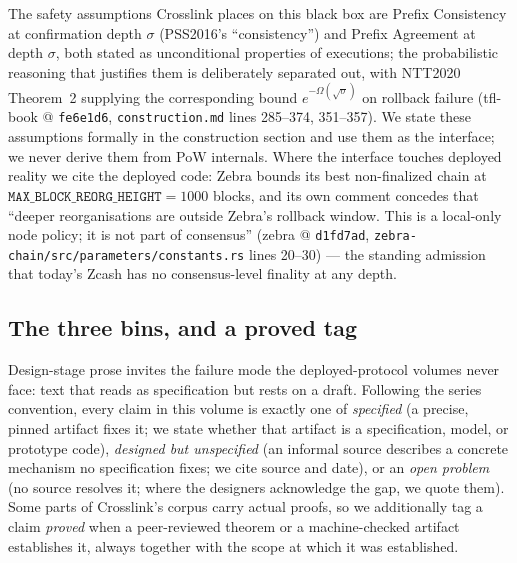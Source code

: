 \documentclass[11pt,a4paper]{article}
\theoremstyle{definition}
\begin{document}
The safety assumptions Crosslink places on this black box are Prefix
Consistency at confirmation depth $\sigma$ (PSS2016's ``consistency'')
and Prefix Agreement at depth $\sigma$, both stated as unconditional
properties of executions; the probabilistic reasoning that justifies
them is deliberately separated out, with NTT2020 Theorem~2 supplying the
corresponding bound $e^{-\Omega(\sqrt{\sigma})}$ on rollback failure
(tfl-book @ \texttt{fe6e1d6}, \texttt{construction.md} lines 285--374,
351--357). We state these assumptions formally in the construction
section and use them as the interface; we never derive them from PoW
internals. Where the interface touches deployed reality we cite the
deployed code: Zebra bounds its best non-finalized chain at
$\texttt{MAX\_BLOCK\_REORG\_HEIGHT} = 1000$ blocks, and its own comment
concedes that ``deeper reorganisations are outside Zebra's rollback
window. This is a local-only node policy; it is not part of consensus''
(zebra @ \texttt{d1fd7ad},
\texttt{zebra-chain/src/parameters/constants.rs} lines 20--30) --- the
standing admission that today's Zcash has no consensus-level finality at
any depth.

\subsection{The three bins, and a proved tag}\label{sec:xl-bins}

Design-stage prose invites the failure mode the deployed-protocol
volumes never face: text that reads as specification but rests on a
draft. Following the series convention, every claim in this volume is exactly
one of \emph{specified} (a precise, pinned artifact fixes it; we state whether
that artifact is a specification, model, or prototype code),
\emph{designed but unspecified} (an informal
source describes a concrete mechanism no specification fixes; we cite
source and date), or an \emph{open problem} (no source resolves it;
where the designers acknowledge the gap, we quote them). Some parts of
Crosslink's corpus carry actual proofs, so we additionally tag a claim
\emph{proved} when a peer-reviewed
theorem or a machine-checked artifact establishes it, always together
with the scope at which it was established.
\end{document}
